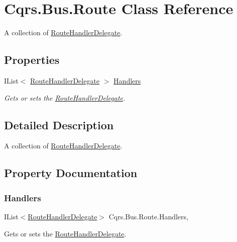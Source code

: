 \hypertarget{classCqrs_1_1Bus_1_1Route}{}\section{Cqrs.\+Bus.\+Route Class Reference}
\label{classCqrs_1_1Bus_1_1Route}


A collection of \hyperlink{classCqrs_1_1Bus_1_1RouteHandlerDelegate}{Route\+Handler\+Delegate}.  


\subsection*{Properties}
\begin{DoxyCompactItemize}
\item 
I\+List$<$ \hyperlink{classCqrs_1_1Bus_1_1RouteHandlerDelegate}{Route\+Handler\+Delegate} $>$ \hyperlink{classCqrs_1_1Bus_1_1Route_ac82e93e4bb4667c9d1683d07c28d8b04_ac82e93e4bb4667c9d1683d07c28d8b04}{Handlers}
\begin{DoxyCompactList}\small\item\em Gets or sets the \hyperlink{classCqrs_1_1Bus_1_1RouteHandlerDelegate}{Route\+Handler\+Delegate}. \end{DoxyCompactList}\end{DoxyCompactItemize}


\subsection{Detailed Description}
A collection of \hyperlink{classCqrs_1_1Bus_1_1RouteHandlerDelegate}{Route\+Handler\+Delegate}. 



\subsection{Property Documentation}
\mbox{\label{classCqrs_1_1Bus_1_1Route_ac82e93e4bb4667c9d1683d07c28d8b04_ac82e93e4bb4667c9d1683d07c28d8b04}} 
\subsubsection{\texorpdfstring{Handlers}{Handlers}}
{\footnotesize\ttfamily I\+List$<$\hyperlink{classCqrs_1_1Bus_1_1RouteHandlerDelegate}{Route\+Handler\+Delegate}$>$ Cqrs.\+Bus.\+Route.\+Handlers\hspace{0.3cm}{\ttfamily [get]}, {\ttfamily [set]}}



Gets or sets the \hyperlink{classCqrs_1_1Bus_1_1RouteHandlerDelegate}{Route\+Handler\+Delegate}. 

